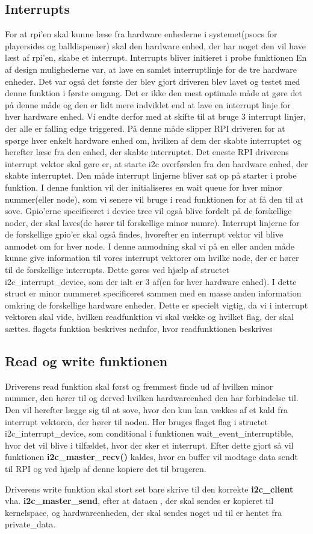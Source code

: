 \documentclass[Softwaredesign/Softwaredesign_main.tex]{subfiles}
\begin{document}
\subsection{Interrupts}
For at rpi'en skal kunne læse fra hardware enhederne i systemet(psocs for playersides og balldispenser) skal den hardware enhed, der har noget den vil have læst af rpi'en, skabe et interrupt. Interrupts bliver initieret i probe funktionen 
 En af design mulighederne var, at lave en samlet interruptlinje for de tre hardware enheder. Det var også det første der blev gjort driveren blev lavet og testet med denne funktion i første omgang. Det er ikke den mest optimale måde at gøre det på denne måde og den er lidt mere indviklet end at lave en interrupt linje for hver hardware enhed. Vi endte derfor med at skifte til at bruge 3 interrupt linjer, der alle er falling edge triggered. På denne måde slipper RPI driveren for at spørge hver enkelt hardware enhed om, hvilken af dem der skabte interruptet og herefter læse fra den enhed, der skabte interruptet. Det eneste RPI driverens interrupt vektor skal gøre er, at starte i2c overførslen fra den hardware enhed, der skabte interruptet. Den måde interrupt linjerne bliver sat op på starter i probe funktion. I denne funktion vil der initialiseres en wait queue for hver minor nummer(eller node), som vi senere vil bruge i  read funktionen for at få den til at sove. Gpio'erne specificeret i device tree vil også blive fordelt på de forskellige noder, der skal laves(de hører til forskellige minor numre). Interrupt linjerne for de forskellige gpio'er skal også findes, hvorefter en interrupt vektor vil blive anmodet om for hver node. I denne anmodning skal vi på en eller anden måde kunne give information til vores interrupt vektorer om hvilke node, der er hører til de forskellige interrupts. Dette gøres ved hjælp af structet i2c\_interrupt\_device, som der ialt er 3 af(en for hver hardware enhed). I dette struct er minor nummeret specificeret sammen med en masse anden information omkring de forskellige hardware enheder. Dette er specielt vigtig, da vi i interrupt vektoren skal vide, hvilken readfunktion vi skal vække og hvilket flag, der skal sættes. flagets funktion beskrives nednfor, hvor readfunktionen beskrives
 \subsection{Read og write funktionen}
 Driverens read funktion skal først og fremmest finde ud af hvilken minor nummer, den hører til og derved hvilken hardwareenhed den har forbindelse til. Den vil herefter lægge sig til at sove, hvor den kun kan vækkes af et kald fra interrupt vektoren, der hører til noden. Her bruges flaget flag i structet i2c\_interrupt\_device, som conditional i funktionen wait\_event\_interruptible, hvor det vil blive i tilfældet, hvor der sker et interrupt. Efter dette gjort så vil funktionen \textbf{i2c\_master\_recv()} kaldes, hvor en buffer vil modtage data sendt til RPI og ved hjælp af denne kopiere det til brugeren.
 
 Driverens write funktion skal stort set bare skrive til den korrekte \textbf{i2c\_client} vha. \textbf{i2c\_master\_send}, efter at dataen , der skal sendes er kopieret til kernelspace, og hardwareenheden, der skal sendes noget ud til er hentet fra private\_data.
\end{document}
